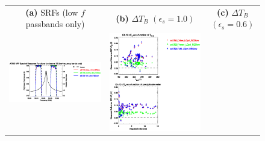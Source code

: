 \begin{figure}[H]
  \centering
  \begin{tabular}{c c c}
    \textsf{\textbf{(a)} SRFs (low $f$ passbands only)} &
    \textsf{\textbf{(b)} $\Delta T_B$ $(\epsilon_s = 1.0)$} &
    \textsf{\textbf{(c)} $\Delta T_B$ $(\epsilon_s = 0.6)$} \\
    \includegraphics[bb=80 400 280 558,clip,scale=0.85]{graphics/srf/Vset/atms_npp.ch13.osrf.eps} &
    \includegraphics[bb=85 400 260 558,clip,scale=0.85]{graphics/dtb/Vset/e1.0_r0.0/atms_npp.ch13.dTb.eps} & 

\end{tabular}
\end{figure}
